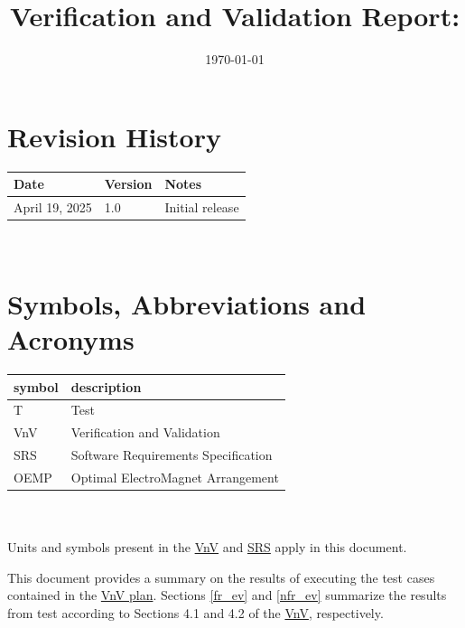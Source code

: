 \documentclass[12pt, titlepage]{article}
\begin{document}
\title{Verification and Validation Report: \progname} 
\author{\authname}
\date{\today}
	
\maketitle


\section{Revision History}

\begin{tabularx}{\textwidth}{p{3cm}p{2cm}X}
\toprule {\bf Date} & {\bf Version} & {\bf Notes}\\
\midrule
April 19, 2025 & 1.0 & Initial release\\
\bottomrule
\end{tabularx}

~\newpage

\section{Symbols, Abbreviations and Acronyms}

\renewcommand{\arraystretch}{1.2}
\begin{tabular}{l l} 
  \toprule		
  \textbf{symbol} & \textbf{description}\\
  \midrule 
  T & Test\\
  VnV & Verification and Validation\\
  SRS & Software Requirements Specification\\
  OEMP & Optimal ElectroMagnet Arrangement\\
  \bottomrule
\end{tabular}\\ \\
Units and symbols present in the \href{https://github.com/husseinsd1/optimal-em-arrangement/tree/main/docs/VnVPlan}{VnV} and \href{https://github.com/husseinsd1/optimal-em-arrangement/blob/main/docs/SRS/SRS.pdf}{SRS} apply in this document.

\newpage

\tableofcontents

\listoftables %

\newpage


This document provides a summary on the results of executing the test cases contained in the \href{https://github.com/husseinsd1/optimal-em-arrangement/tree/main/docs/VnVPlan}{VnV plan}. Sections \ref{fr_ev} and \ref{nfr_ev} summarize the results from test according to Sections 4.1 and 4.2 of the \href{https://github.com/husseinsd1/optimal-em-arrangement/tree/main/docs/VnVPlan}{VnV}, respectively. 
\end{document}
